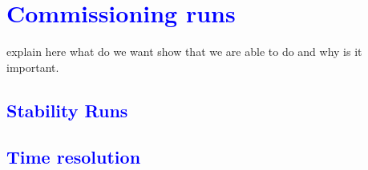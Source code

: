 \section{\textcolor{blue}{Commissioning runs}}
explain here what do we want show that we are able to do and why is it important.
\subsection{\textcolor{blue}{Stability Runs}}
\subsection{\textcolor{blue}{Time resolution}}
 